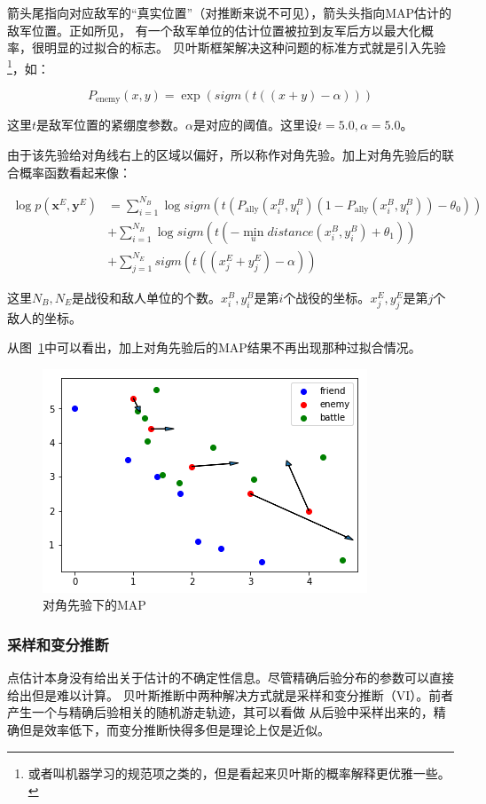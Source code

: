 \documentclass{article}
\begin{document}
箭头尾指向对应敌军的“真实位置”（对推断来说不可见），箭头头指向MAP估计的敌军位置。正如所见，
有一个敌军单位的估计位置被拉到友军后方以最大化概率，很明显的过拟合的标志。
贝叶斯框架解决这种问题的标准方式就是引入先验
\footnote{或者叫机器学习的规范项之类的，但是看起来贝叶斯的概率解释更优雅一些。}，如：

$$
P_{\text{enemy}}(x,y) = \exp(sigm(t((x+y) - \alpha)))
$$


这里$t$是敌军位置的紧绷度参数。$\alpha$是对应的阈值。这里设$t=5.0,\alpha=5.0$。

由于该先验给对角线右上的区域以偏好，所以称作对角先验。加上对角先验后的联合概率函数看起来像：

\begin{align*}
\log p(\mathbf{x}^E,\mathbf{y}^E) &= \sum_{i=1}^{N_B} \log sigm(t (P_\text{ally}(x^B_i,y^B_i)(1-P_\text{ally}(x^B_i,y^B_i)) - \theta_0)) \\
                                  &+ \sum_{i=1}^{N_B} \log sigm(t(-\min_{u} distance(x^B_i,y^B_i) + \theta_1)) \\
                                  &+ \sum_{j=1}^{N_E} sigm(t((x^E_j+y^E_j) - \alpha))
\end{align*}


这里$N_B,N_E$是战役和敌人单位的个数。$x^B_i,y^B_i$是第$i$个战役的坐标。$x^E_j,y^E_j$是第$j$个敌人的坐标。

从图~\ref{fig:MAPtwo}中可以看出，加上对角先验后的MAP结果不再出现那种过拟合情况。

\begin{figure}[ht]
\includegraphics[width=0.6\linewidth]{MAP2.png}
\caption{对角先验下的MAP}
\label{fig:MAPtwo}
\end{figure}

\subsubsection{采样和变分推断}


点估计本身没有给出关于估计的不确定性信息。尽管精确后验分布的参数可以直接给出但是难以计算。
贝叶斯推断中两种解决方式就是采样和变分推断（VI）。前者产生一个与精确后验相关的随机游走轨迹，其可以看做
从后验中采样出来的，精确但是效率低下，而变分推断快得多但是理论上仅是近似。
\end{document}
